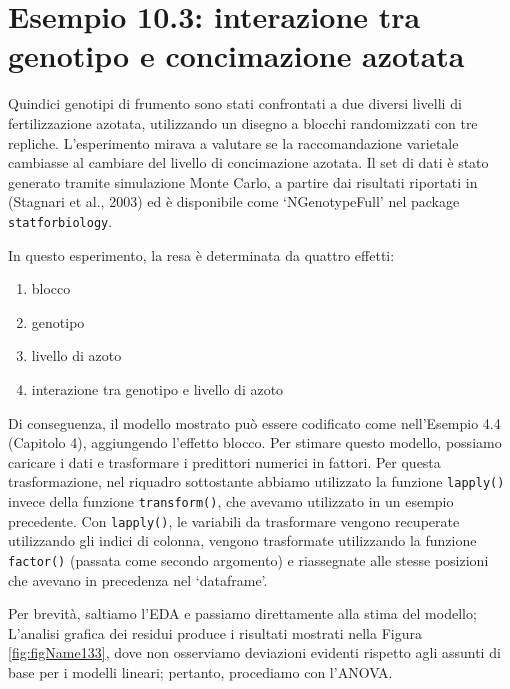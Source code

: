 \documentclass[
  12pt,
]{book}
\providecommand{\tightlist}{%
  \setlength{\itemsep}{0pt}\setlength{\parskip}{0pt}}
\begin{document}
\hypertarget{esempio-10.3-interazione-tra-genotipo-e-concimazione-azotata}{%
\section{Esempio 10.3: interazione tra genotipo e concimazione azotata}\label{esempio-10.3-interazione-tra-genotipo-e-concimazione-azotata}}

Quindici genotipi di frumento sono stati confrontati a due diversi livelli di fertilizzazione azotata, utilizzando un disegno a blocchi randomizzati con tre repliche. L'esperimento mirava a valutare se la raccomandazione varietale cambiasse al cambiare del livello di concimazione azotata. Il set di dati è stato generato tramite simulazione Monte Carlo, a partire dai risultati riportati in (Stagnari et al., 2003) ed è disponibile come `NGenotypeFull' nel package \texttt{statforbiology}.

In questo esperimento, la resa è determinata da quattro effetti:

\begin{enumerate}
\def\labelenumi{\arabic{enumi}.}
\tightlist
\item
  blocco
\item
  genotipo
\item
  livello di azoto
\item
  interazione tra genotipo e livello di azoto
\end{enumerate}

Di conseguenza, il modello mostrato può essere codificato come nell'Esempio 4.4 (Capitolo 4), aggiungendo l'effetto blocco. Per stimare questo modello, possiamo caricare i dati e trasformare i predittori numerici in fattori. Per questa trasformazione, nel riquadro sottostante abbiamo utilizzato la funzione \texttt{lapply()} invece della funzione \texttt{transform()}, che avevamo utilizzato in un esempio precedente. Con \texttt{lapply()}, le variabili da trasformare vengono recuperate utilizzando gli indici di colonna, vengono trasformate utilizzando la funzione \texttt{factor()} (passata come secondo argomento) e riassegnate alle stesse posizioni che avevano in precedenza nel `dataframe'.

Per brevità, saltiamo l'EDA e passiamo direttamente alla stima del modello; L'analisi grafica dei residui produce i risultati mostrati nella Figura \ref{fig:figName133}, dove non osserviamo deviazioni evidenti rispetto agli assunti di base per i modelli lineari; pertanto, procediamo con l'ANOVA.
\end{document}
